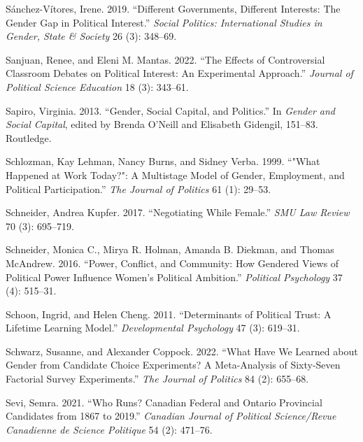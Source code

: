 \documentclass[
  letterpaper,
  DIV=11,
  numbers=noendperiod]{scrreprt}
\newlength{\cslhangindent}
\newlength{\cslentryspacingunit} %
\newenvironment{CSLReferences}[2] %
 {%
  \setlength{\parindent}{0pt}
  \ifodd #1
  \let\oldpar\par
  \def\par{\hangindent=\cslhangindent\oldpar}
  \fi
  \setlength{\parskip}{#2\cslentryspacingunit}
 }%
 {}
\begin{document}
\begin{CSLReferences}{1}{0}
\leavevmode{}%
Sánchez-Vítores, Irene. 2019. {``{Different Governments, Different
Interests: The Gender Gap in Political Interest}.''} \emph{{Social
Politics: International Studies in Gender, State \& Society}} 26 (3):
348--69.

\leavevmode{}%
Sanjuan, Renee, and Eleni M. Mantas. 2022. {``{The Effects of
Controversial Classroom Debates on Political Interest: An Experimental
Approach}.''} \emph{Journal of Political Science Education} 18 (3):
343--61.

\leavevmode{}%
Sapiro, Virginia. 2013. {``{Gender, Social Capital, and Politics}.''} In
\emph{{Gender and Social Capital}}, edited by Brenda O'Neill and
Elisabeth Gidengil, 151--83. Routledge.

\leavevmode{}%
Schlozman, Kay Lehman, Nancy Burns, and Sidney Verba. 1999. {``{"What
Happened at Work Today?": A Multistage Model of Gender, Employment, and
Political Participation}.''} \emph{The Journal of Politics} 61 (1):
29--53.

\leavevmode{}%
Schneider, Andrea Kupfer. 2017. {``{Negotiating While Female}.''}
\emph{SMU Law Review} 70 (3): 695--719.

\leavevmode{}%
Schneider, Monica C., Mirya R. Holman, Amanda B. Diekman, and Thomas
McAndrew. 2016. {``{Power, Conflict, and Community: How Gendered Views
of Political Power Influence Women's Political Ambition}.''}
\emph{Political Psychology} 37 (4): 515--31.

\leavevmode{}%
Schoon, Ingrid, and Helen Cheng. 2011. {``{Determinants of Political
Trust: A Lifetime Learning Model}.''} \emph{Developmental Psychology} 47
(3): 619--31.

\leavevmode{}%
Schwarz, Susanne, and Alexander Coppock. 2022. {``{What Have We Learned
about Gender from Candidate Choice Experiments? A Meta-Analysis of
Sixty-Seven Factorial Survey Experiments}.''} \emph{The Journal of
Politics} 84 (2): 655--68.

\leavevmode{}%
Sevi, Semra. 2021. {``{Who Runs? Canadian Federal and Ontario Provincial
Candidates from 1867 to 2019}.''} \emph{Canadian Journal of Political
Science/Revue Canadienne de Science Politique} 54 (2): 471--76.


\end{CSLReferences}
\end{document}
